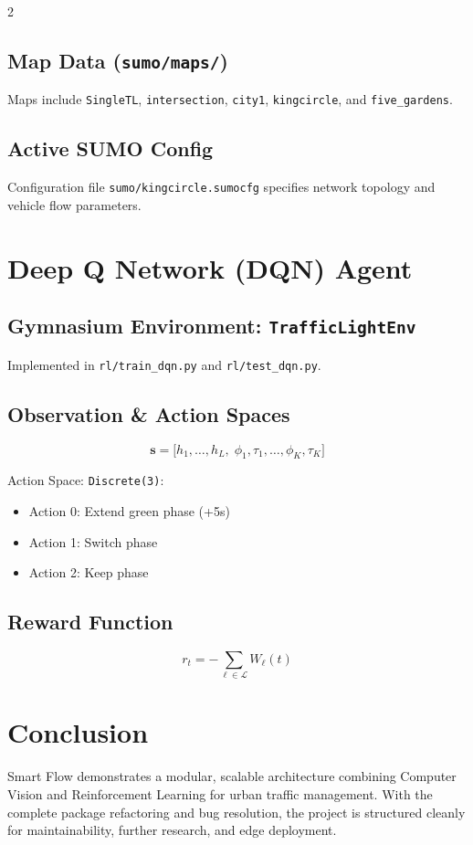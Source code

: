 \documentclass[10pt, a4paper]{article}
\begin{document}
\begin{multicols}{2}
\subsection{Map Data (\texttt{sumo/maps/})}
Maps include \texttt{SingleTL}, \texttt{intersection}, \texttt{city1},
\texttt{kingcircle}, and \texttt{five\_gardens}.

\subsection{Active SUMO Config}
Configuration file \texttt{sumo/kingcircle.sumocfg} specifies network topology
and vehicle flow parameters.

\section{Deep Q Network (DQN) Agent}

\subsection{Gymnasium Environment: \texttt{TrafficLightEnv}}
Implemented in \texttt{rl/train\_dqn.py} and \texttt{rl/test\_dqn.py}.

\subsection{Observation \& Action Spaces}
\begin{equation}
\mathbf{s} = \bigl[h_1, \ldots, h_L,\; \phi_1, \tau_1, \ldots, \phi_K, \tau_K\bigr]
\end{equation}

Action Space: \texttt{Discrete(3)}:
\begin{itemize}
  \item Action 0: Extend green phase (+5s)
  \item Action 1: Switch phase
  \item Action 2: Keep phase
\end{itemize}

\subsection{Reward Function}
\begin{equation}
r_t = -\sum_{\ell \in \mathcal{L}} W_\ell(t)
\end{equation}

\section{Conclusion}

Smart Flow demonstrates a modular, scalable architecture combining Computer
Vision and Reinforcement Learning for urban traffic management. With the complete
package refactoring and bug resolution, the project is structured cleanly for
maintainability, further research, and edge deployment.

\end{multicols}
\end{document}
